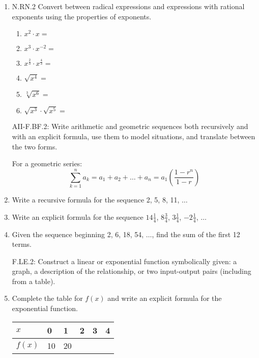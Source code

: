 \documentclass[12pt, twoside]{article}
\begin{document}
\begin{enumerate}[itemsep=0.5cm]
\item N.RN.2 Convert between radical expressions and expressions with rational exponents using the properties of exponents.
    \begin{multicols}{2}
    \begin{enumerate}[itemsep=0.5cm]
        \item $x^2 \cdot x =$
        \item $x^3 \cdot x^{-2} =$
        \item $\displaystyle x^{\frac{2}{3}} \cdot x^{\frac{4}{3}} =$
        \item $\sqrt{x^4} =$
        \item $\sqrt[3]{x^6} =$
        \item $\sqrt{x^3} \cdot \sqrt{x^5}= $
    \end{enumerate}
    \end{multicols}

\newpage
AII-F.BF.2: Write arithmetic and geometric sequences both recursively and with an explicit formula, use them to model situations, and translate between the two forms.

For a geometric series:
$$\sum_{k=1}^{n} a_k = a_1 + a_2 + \ldots + a_n = a_1 \left( \frac{1-r^n}{1-r} \right)$$

\item Write a recursive formula for the sequence 2, 5, 8, 11, $\ldots$ \vspace{3cm}

\item Write an explicit formula for the sequence $14 \frac{1}{4}$, $8 \frac{3}{4}$, $3 \frac{1}{4}$, $-2 \frac{1}{4}$, $\ldots$ \vspace{3cm}


\item Given the sequence beginning  2, 6, 18, 54, $\ldots$, find the sum of the first 12 terms. \vspace{3cm}

F.LE.2: Construct a linear or exponential function symbolically given: a graph, a description of the relationship, or two input-output pairs (including from a table).
\item Complete the table for $f(x)$ and write an explicit formula for the exponential function.
    \begin{center}
    \begin{tabular}{|p{1cm}|p{1cm}|p{1cm}|p{1cm}|p{1cm}|p{1cm}|}
        \hline
        $x$ & 0 & 1 & 2 & 3 & 4 \\
        \hline
        $f(x)$ & 10 & 20 & & & \\[0.25cm]
        \hline
    \end{tabular}
    \end{center}


\end{enumerate}
\end{document}
